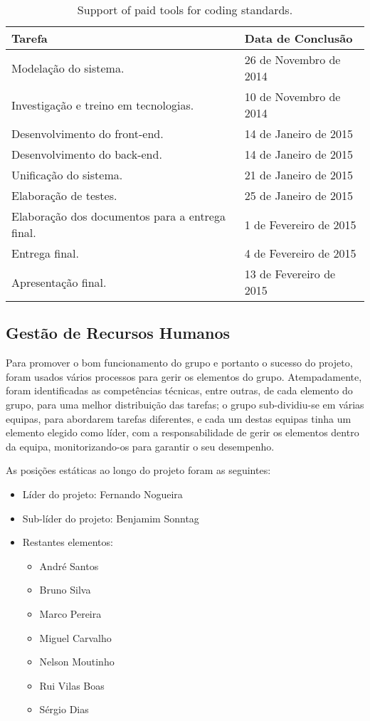\begin{table}[H]\centering
    \begin{tabular}{@{}p{}l@{}}\toprule
    Tarefa & Data de Conclusão \\
    \midrule
    Modelação do sistema. & 26 de Novembro de 2014 \\
    Investigação e treino em tecnologias. & 10 de Novembro de 2014 \\
    Desenvolvimento do front-end. & 14 de Janeiro de 2015 \\
    Desenvolvimento do back-end. & 14 de Janeiro de 2015 \\
    Unificação do sistema. & 21 de Janeiro de 2015 \\
    Elaboração de testes. & 25 de Janeiro de 2015 \\
    Elaboração dos documentos para a entrega final. & 1 de Fevereiro de 2015 \\
    Entrega final. & 4 de Fevereiro de 2015 \\
    Apresentação final. & 13 de Fevereiro de 2015 \\
    \bottomrule
    \end{tabular}
    \caption{Support of paid tools for coding standards.}
    \label{tab:tool_support}
\end{table}

\subsection*{Gestão de Recursos Humanos}
Para promover o bom funcionamento do grupo e portanto o sucesso do projeto, foram usados vários processos para gerir os elementos do grupo.
Atempadamente, foram identificadas as competências técnicas, entre outras, de cada elemento do grupo, para uma melhor distribuição das tarefas; o grupo sub-dividiu-se em várias equipas, para abordarem tarefas diferentes, e cada um destas equipas tinha um elemento elegido como líder, com a responsabilidade de gerir os elementos dentro da equipa, monitorizando-os para garantir o seu desempenho.

As posições estáticas ao longo do projeto foram as seguintes:
\begin{itemize}
    \item Líder do projeto: Fernando Nogueira
    \item Sub-líder do projeto: Benjamim Sonntag
    \item Restantes elementos:
        \begin{itemize}
            \item André Santos
            \item Bruno Silva
            \item Marco Pereira
            \item Miguel Carvalho
            \item Nelson Moutinho
            \item Rui Vilas Boas
            \item Sérgio Dias
        \end{itemize}
\end{itemize}

